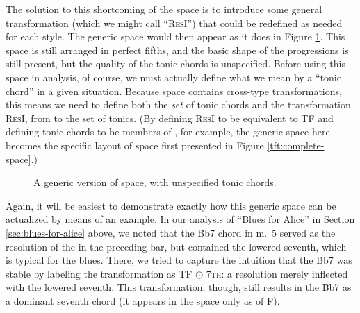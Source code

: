 The solution to this shortcoming of the space is to introduce some general
transformation (which we might call ``\textsc{ResI}'') that could be redefined
as needed for each style. The generic space would then appear as it
does in Figure \ref{tfe:generic-space}. This space is still arranged in
perfect fifths, and the basic shape of the \tfo progressions is still present,
but the quality of the tonic chords is unspecified. Before using this space in
analysis, of course, we must actually define what we mean by a ``tonic chord''
in a given situation. Because \tf space contains cross-type transformations,
this means we need to define both the \emph{set} of tonic chords and the
transformation \textsc{ResI}, from \Sdom to the set of tonics. (By defining
\textsc{ResI} to be equivalent to TF and defining tonic chords to be members
of \Smaj, for example, the generic space here becomes the specific layout of
\tf space first presented in Figure \ref{tft:complete-space}.)

\begin{figure}[tbp]
  \caption{A generic version of \tf space, with unspecified tonic chords.}
  \label{tfe:generic-space}
\end{figure}

Again, it will be easiest to demonstrate exactly how this generic space can be
actualized by means of an example. In our analysis of ``Blues for Alice'' in
Section \ref{sec:blues-for-alice} above, we noted that the \h{Bb7} chord in
m.~5 served as the resolution of the \tf in the preceding bar, but contained
the lowered seventh, which is typical for the blues. There, we tried to
capture the intuition that the \h{Bb7} was stable by labeling the
transformation as TF $\odot$ \textsc{7th}: a resolution merely inflected with
the lowered seventh. This transformation, though, still results in the \h{Bb7}
as a dominant seventh chord (it appears in the space only as \V of F).

